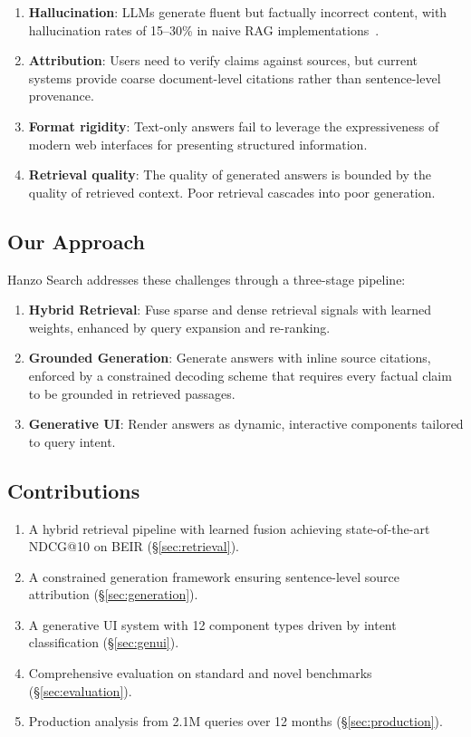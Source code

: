 \documentclass[11pt,twocolumn]{article}
\begin{document}
\begin{enumerate}[leftmargin=1.4em]
    \item \textbf{Hallucination}: LLMs generate fluent but factually incorrect content, with hallucination rates of 15--30\% in naive RAG implementations~\cite{huang2023hallucination}.
    \item \textbf{Attribution}: Users need to verify claims against sources, but current systems provide coarse document-level citations rather than sentence-level provenance.
    \item \textbf{Format rigidity}: Text-only answers fail to leverage the expressiveness of modern web interfaces for presenting structured information.
    \item \textbf{Retrieval quality}: The quality of generated answers is bounded by the quality of retrieved context. Poor retrieval cascades into poor generation.
\end{enumerate}

\subsection{Our Approach}

Hanzo Search addresses these challenges through a three-stage pipeline:

\begin{enumerate}[leftmargin=1.4em]
    \item \textbf{Hybrid Retrieval}: Fuse sparse and dense retrieval signals with learned weights, enhanced by query expansion and re-ranking.
    \item \textbf{Grounded Generation}: Generate answers with inline source citations, enforced by a constrained decoding scheme that requires every factual claim to be grounded in retrieved passages.
    \item \textbf{Generative UI}: Render answers as dynamic, interactive components tailored to query intent.
\end{enumerate}

\subsection{Contributions}

\begin{enumerate}[leftmargin=1.4em]
    \item A hybrid retrieval pipeline with learned fusion achieving state-of-the-art NDCG@10 on BEIR (\S\ref{sec:retrieval}).
    \item A constrained generation framework ensuring sentence-level source attribution (\S\ref{sec:generation}).
    \item A generative UI system with 12 component types driven by intent classification (\S\ref{sec:genui}).
    \item Comprehensive evaluation on standard and novel benchmarks (\S\ref{sec:evaluation}).
    \item Production analysis from 2.1M queries over 12 months (\S\ref{sec:production}).
\end{enumerate}
\end{document}
